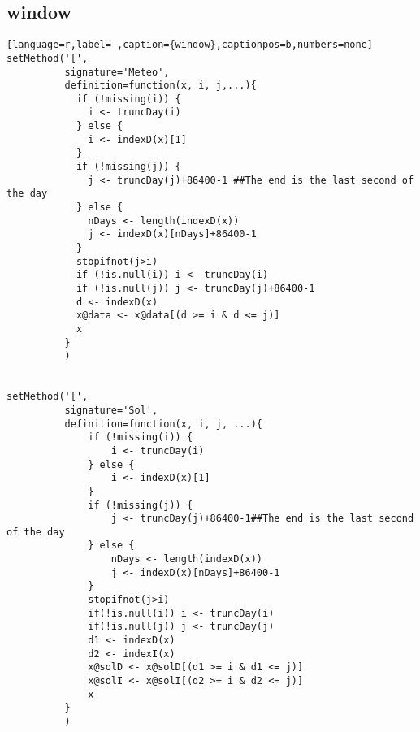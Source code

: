 \subsection{window}
\label{sec:org9d8c799}
\label{subsec:window}
\begin{lstlisting}[language=r,label= ,caption={window},captionpos=b,numbers=none]
setMethod('[',
          signature='Meteo',
          definition=function(x, i, j,...){
            if (!missing(i)) {
              i <- truncDay(i)
            } else {
              i <- indexD(x)[1]
            }
            if (!missing(j)) {
              j <- truncDay(j)+86400-1 ##The end is the last second of the day
            } else {
              nDays <- length(indexD(x))
              j <- indexD(x)[nDays]+86400-1
            }
            stopifnot(j>i)
            if (!is.null(i)) i <- truncDay(i)
            if (!is.null(j)) j <- truncDay(j)+86400-1
            d <- indexD(x)
            x@data <- x@data[(d >= i & d <= j)]
            x
          }
          )


setMethod('[',
          signature='Sol',
          definition=function(x, i, j, ...){
              if (!missing(i)) {
                  i <- truncDay(i)
              } else {
                  i <- indexD(x)[1]
              }
              if (!missing(j)) {
                  j <- truncDay(j)+86400-1##The end is the last second of the day
              } else {
                  nDays <- length(indexD(x))
                  j <- indexD(x)[nDays]+86400-1
              }
              stopifnot(j>i)
              if(!is.null(i)) i <- truncDay(i)
              if(!is.null(j)) j <- truncDay(j)
              d1 <- indexD(x)
              d2 <- indexI(x)
              x@solD <- x@solD[(d1 >= i & d1 <= j)]
              x@solI <- x@solI[(d2 >= i & d2 <= j)]
              x
          }
          )


\end{lstlisting}
